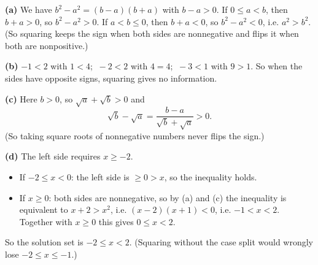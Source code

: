 \textbf{(a)} We have $b^2-a^2=(b-a)(b+a)$ with $b-a>0$. If $0\le a<b$, then $b+a>0$, so $b^2-a^2>0$. If $a<b\le0$, then $b+a<0$, so $b^2-a^2<0$, i.e. $a^2>b^2$. (So squaring keeps the sign when both sides are nonnegative and flips it when both are nonpositive.)

\textbf{(b)} $-1<2$ with $1<4$; $\ -2<2$ with $4=4$; $\ -3<1$ with $9>1$. So when the sides have opposite signs, squaring gives no information.

\textbf{(c)} Here $b>0$, so $\sqrt a+\sqrt b>0$ and
\[\sqrt b-\sqrt a=\dfrac{b-a}{\sqrt b+\sqrt a}>0.\]
(So taking square roots of nonnegative numbers never flips the sign.)

\textbf{(d)} The left side requires $x\ge-2$.
\begin{itemize}
\item If $-2\le x<0$: the left side is $\ge0>x$, so the inequality holds.
\item If $x\ge0$: both sides are nonnegative, so by (a) and (c) the inequality is equivalent to $x+2>x^2$, i.e. $(x-2)(x+1)<0$, i.e. $-1<x<2$. Together with $x\ge0$ this gives $0\le x<2$.
\end{itemize}
So the solution set is $\boxed{-2\le x<2}$. (Squaring without the case split would wrongly lose $-2\le x\le-1$.)

